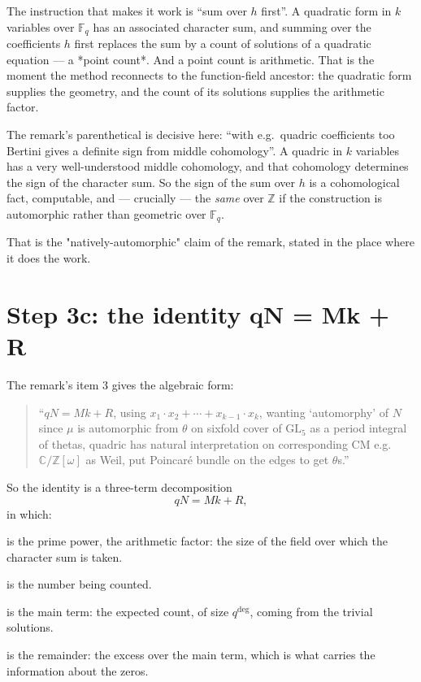 The instruction that makes it work is ``sum over $h$ first''. A quadratic form
in $k$ variables over $\mathbb{F}_q$ has an associated character sum, and
summing over the coefficients $h$ first replaces the sum by a count of solutions
of a quadratic equation --- a *point count*. And a point count is arithmetic.
That is the moment the method reconnects to the function-field ancestor: the
quadratic form supplies the geometry, and the count of its solutions supplies
the arithmetic factor.

The remark's parenthetical is decisive here: ``with e.g.\ quadric
coefficients too Bertini gives a definite sign from middle cohomology''. A
quadric in $k$ variables has a very well-understood middle cohomology, and
that cohomology determines the sign of the character sum. So the sign of the
sum over $h$ is a cohomological fact, computable, and --- crucially --- the
\emph{same} over $\mathbb{Z}$ if the construction is automorphic rather than
geometric over $\mathbb{F}_q$.

That is the "natively-automorphic" claim of the remark, stated in the place
where it does the work.

\section{Step 3c: the identity qN = Mk + R}The remark's item 3 gives the algebraic form:

\begin{quote}
\small
``$qN = Mk + R$, using $x_1\cdot x_2 + \cdots + x_{k-1}\cdot x_k$, wanting
`automorphy' of $N$ since $\mu$ is automorphic from $\theta$ on sixfold cover
of $\mathrm{GL}_5$ as a period integral of thetas, quadric has natural
interpretation on corresponding CM e.g.\ $\mathbb{C}/\mathbb{Z}[\omega]$ as
Weil, put Poincar\'e bundle on the edges to get $\theta$s.''
\end{quote}

So the identity is a three-term decomposition
\begin{equation}
qN = Mk + R,
\label{eq:qNMR}
\end{equation}
in which:

\begin{description}[style=nextline,leftmargin=0pt,labelwidth=0pt,labelsep=0pt,font=\sffamily\bfseries\small,
  itemsep=6pt]
\item[$q$] is the prime power, the arithmetic factor: the size of the field over
which the character sum is taken.
\item[$N$] is the number being counted.
\item[$M$] is the main term: the expected count, of size $q^{\deg}$, coming
from the trivial solutions.
\item[$R$] is the remainder: the excess over the main term, which is what
carries the information about the zeros.
\end{description}


